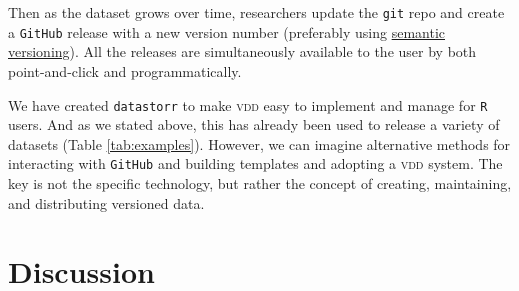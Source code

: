 \documentclass[a4paper,11pt]{article}
\begin{document}
Then as the dataset grows over time, researchers update the \texttt{git} repo and create a \texttt{GitHub} release with a new version number (preferably
using \href{http://semver.org/}{semantic versioning}). All the releases are simultaneously
available to the user by both point-and-click and programmatically. 

We have created \texttt{datastorr} to make \textsc{vdd} easy to implement and manage for \texttt{R} users. And as we stated above, this has already been used to release a variety of datasets (Table \ref{tab:examples}).
However, we can imagine alternative methods for interacting with \texttt{GitHub} and building templates and adopting a \textsc{vdd} system.  The key is not the specific technology, but rather the concept of creating, maintaining, and distributing versioned data.  

\section{Discussion}




\end{document}
